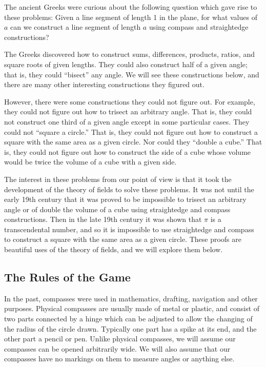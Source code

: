 \documentclass[11pt]{article}
\theoremstyle{definition}
\begin{document}
The ancient Greeks were curious about the following question which gave rise to these problems: Given a line segment of length 1 in the plane, 
for what values of $a$ can we construct a line segment of length $a$ using compass and straightedge constructions?

The Greeks discovered how to construct sums, differences, products, ratios, and square roots of given lengths. They could also construct half of a 
given angle; that is, they could ``bisect'' any angle. We will see these constructions below, and there are many other interesting constructions
they figured out.

However, there were some constructions they could not figure out. For example, they could not figure out how to trisect an arbitrary angle. That is, they could
not construct one third of a given angle except in some particular cases. They could not ``square a circle.'' That is, they could not figure out how to 
construct a square with the same area as a given circle.  Nor could they ``double a cube.'' That is, they could not figure out how to construct the 
side of a cube whose volume would be twice the volume of a cube with a given side.

The interest in these problems from our point of view is that it took the development of the theory of fields to solve these problems. It was not until
the early 19th century that it was proved to be impossible to trisect an arbitrary angle or of double the volume of a cube using straightedge and compass constructions. 
Then in the late 19th century it was shown that $\pi$ is a transcendental number, and so it is impossible to use straightedge and compass 
to construct a square with the same area as a given circle. These proofs are beautiful uses of the theory of fields, and we will
explore them below.

\subsection{The Rules of the Game}

In the past, compasses were used in mathematics, drafting, navigation and other purposes. Physical compasses are usually made of metal or 
plastic, and consist of two parts connected by a hinge which can be adjusted to allow the changing of the radius of the circle drawn. Typically 
one part has a spike at its end, and the other part a pencil or pen. Unlike physical compasses, we will assume our compasses can be opened arbitrarily 
wide. We will also assume that our compasses have no markings on them to measure angles or anything else. 
\end{document}
